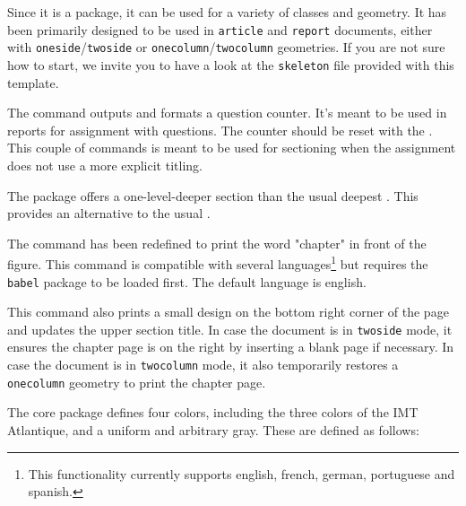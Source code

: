 \documentclass{report}
\begin{document}
Since it is a package, it can be used for a variety of classes and geometry. 
It has been primarily designed to be used in \texttt{article} and \texttt{report} documents, either with \texttt{oneside}/\texttt{twoside} or \texttt{onecolumn}/\texttt{twocolumn} geometries. 
If you are not sure how to start, we invite you to have a look at the \texttt{skeleton} file provided with this template.

The  command outputs and formats a question counter.
It's meant to be used in reports for assignment with questions.
The counter should be reset with the .
This couple of commands is meant to be used for sectioning when the assignment does not use a more explicit titling.


The  package offers a one-level-deeper section than the usual deepest .
This provides an alternative to the usual .


The  command has been redefined to print the word "chapter" in front of the figure. 
This command is compatible with several languages\footnote{This functionality currently supports english, french, german, portuguese and spanish.} but requires the \texttt{babel} package to be loaded first. 
The default language is english.

This command also prints a small design on the bottom right corner of the page and updates the upper section title. 
In case the document is in \texttt{twoside} mode, it ensures the chapter page is on the right by inserting a blank page if necessary. 
In case the document is in \texttt{twocolumn} mode, it also temporarily restores a \texttt{onecolumn} geometry to print the chapter page.



The core package defines four colors, including the three colors of the IMT Atlantique, and a uniform and arbitrary gray.
These are defined as follows:
\end{document}

